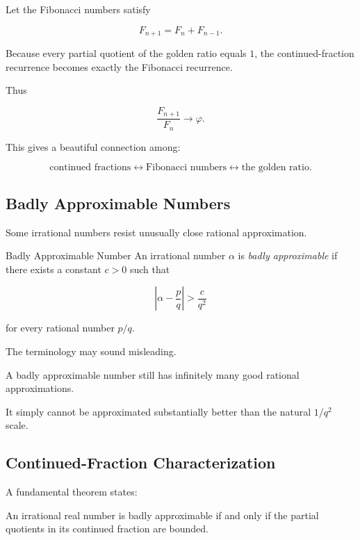 Let the Fibonacci numbers satisfy

\[ F_{n+1}=F_n+F_{n-1}. \]

Because every partial quotient of the golden ratio equals \(1\), the
continued-fraction recurrence becomes exactly the Fibonacci recurrence.

Thus

\[ \boxed{\frac{F_{n+1}}{F_n}\to\varphi.} \]

This gives a beautiful connection among:

\[
\text{continued fractions}
\longleftrightarrow
\text{Fibonacci numbers}
\longleftrightarrow
\text{the golden ratio}.
\]

\subsection{Badly Approximable Numbers}
\label{subsec:badly-approximable-numbers}

Some irrational numbers resist unusually close rational approximation.

\begin{definitionbox}{Badly Approximable Number}
An irrational number \(\alpha\) is \emph{badly approximable} if there exists
a constant \(c>0\) such that

\[ \boxed{\left|\alpha-\frac pq\right|>\frac{c}{q^2}} \]

for every rational number \(p/q\).
\end{definitionbox}

The terminology may sound misleading.

A badly approximable number still has infinitely many good rational
approximations.

It simply cannot be approximated substantially better than the natural
\(1/q^2\) scale.

\subsection{Continued-Fraction Characterization}
\label{subsec:badly-approximable-cf-characterization}

A fundamental theorem states:

\begin{theorem}
An irrational real number is badly approximable if and only if the partial
quotients in its continued fraction are bounded.
\end{theorem}

